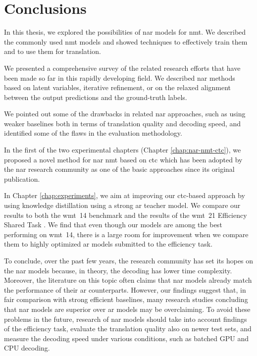 \chapter{Conclusions}
\label{chap:conclusions}

In this thesis, we explored the possibilities of \ac{nar} models for
\ac{nmt}. We described the commonly used \ac{nmt} models and showed techniques
to effectively train them and to use them for translation.

We presented a comprehensive survey of the related research efforts that have
been made so far in this rapidly developing field. We described \ac{nar}
methods based on latent variables, iterative refinement, or on the relaxed
alignment between the output predictions and the ground-truth labels.

We pointed out some of the drawbacks in related \ac{nar} approaches, such as
using weaker baselines both in terms of translation quality and decoding speed,
and identified some of the flaws in the evaluation methodology.

In the first of the two experimental chapters (Chapter \ref{chap:nar-nmt-ctc}),
we proposed a novel method for \ac{nar} \ac{nmt} based on \ac{ctc} which has
been adopted by the \ac{nar} research community as one of the basic approaches
since its original publication.

In Chapter \ref{chap:experiments}, we aim at improving our \acs{ctc}-based
approach by using knowledge distillation using a strong \ac{ar} teacher model.
We compare our results to both the \acs{wmt}~14 benchmark and the results of
the \acs{wmt}~21 Efficiency Shared Task \citep{heafield-etal-2021-findings}. We
find that even though our models are among the best performing on \acs{wmt}~14,
there is a large room for improvement when we compare them to highly optimized
\acl{ar} models submitted to the efficiency task.

To conclude, over the past few years, the research community has set its hopes
on the \ac{nar} models because, in theory, the decoding has lower time
complexity. Moreover, the literature on this topic often claims that \ac{nar}
models already match the performance of their \ac{ar} counterparts. However,
our findings suggest that, in fair comparison with strong efficient baselines,
many research studies concluding that \ac{nar} models are superior over \ac{ar}
models may be overclaiming. To avoid these problems in the future, research of
\ac{nar} models should take into account findings of the efficiency task,
evaluate the translation quality also on newer test sets, and measure the
decoding speed under various conditions, such as batched GPU and CPU decoding.


